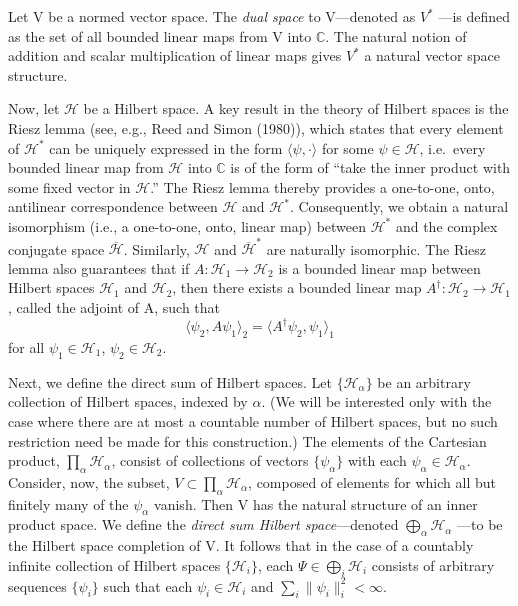 \documentclass[11pt,a4paper]{article}
\begin{document}
Let V be a normed vector space. The \emph{dual space} to V---denoted as \(V^*\) ---is defined as the set of all bounded linear maps from V into \(\mathbb{C}\). The natural notion of addition and scalar multiplication of linear maps gives \(V^*\) a natural vector space structure.

Now, let \(\mathcal{H}\) be a Hilbert space. A key result in the theory of Hilbert spaces is the Riesz lemma (see, e.g., Reed and Simon (1980)), which states that every element of \(\mathcal H^*\) can be uniquely expressed in the form \(\langle\psi,\cdot\rangle\) for some \(\psi\in\mathcal{H}\), i.e.~every bounded linear map from \(\mathcal{H}\) into \(\mathbb C\) is of the form of ``take the inner product with some fixed vector in \(\mathcal{H}\).'' The Riesz lemma thereby provides a one-to-one, onto, antilinear correspondence between \(\mathcal H\) and \(\mathcal H^*\). Consequently, we obtain a natural isomorphism (i.e., a one-to-one, onto, linear map) \hypertarget{source-204}{} between \(\mathcal H^*\) and the complex conjugate space \(\overline{\mathcal{H}}\). Similarly, \(\mathcal{H}\) and \(\overline{\mathcal H}^*\) are naturally isomorphic. The Riesz lemma also guarantees that if \(A:\mathcal{H}_1 \to \mathcal{H}_2\) is a bounded linear map between Hilbert spaces \(\mathcal{H}_1\) and \(\mathcal{H}_2\), then there exists a bounded linear map \(A^{\dagger}:\mathcal{H}_2 \to \mathcal{H}_1\), called the adjoint of A, such that
\begin{equation*}
\langle \psi_2, A\psi_1 \rangle_2 = \langle A^{\dagger}\psi_2, \psi_1 \rangle_1 \tag{A.2.3}\label{eq:A.2.3}
\end{equation*}
for all \(\psi_1 \in \mathcal{H}_1\), \(\psi_2 \in \mathcal{H}_2\).

Next, we define the direct sum of Hilbert spaces. Let \(\{\mathcal{H}_{\alpha}\}\) be an arbitrary collection of Hilbert spaces, indexed by \(\alpha\). (We will be interested only with the case where there are at most a countable number of Hilbert spaces, but no such restriction need be made for this construction.) The elements of the Cartesian product, \(\prod_\alpha\mathcal H_\alpha\), consist of collections of vectors \(\{\psi_{\alpha}\}\) with each \(\psi_{\alpha} \in \mathcal{H}_{\alpha}\). Consider, now, the subset, \(V \subset \prod_\alpha\mathcal H_\alpha\), composed of elements for which all but finitely many of the \(\psi_{\alpha}\) vanish. Then V has the natural structure of an inner product space. We define the \emph{direct sum Hilbert space}---denoted \(\bigoplus_\alpha\mathcal H_\alpha\) ---to be the Hilbert space completion of V. It follows that in the case of a countably infinite collection of Hilbert spaces \(\{\mathcal{H}_i\}\), each \(\Psi \in \bigoplus_i\mathcal H_i\) consists of arbitrary sequences \(\{\psi_i\}\) such that each \(\psi_i \in \mathcal{H}_i\) and \(\sum_i\lVert\psi_i\rVert_i^2 < \infty\).
\end{document}
